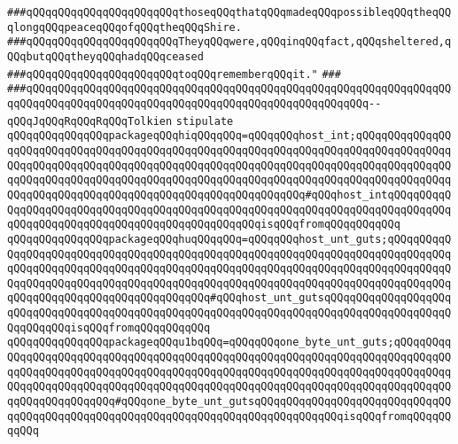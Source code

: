 \verb|###qQQqqQQqqQQqqQQqqQQqqQQqthoseqQQqthatqQQqmadeqQQqpossibleqQQqtheqQQqlongqQQqpeaceqQQqofqQQqtheqQQqShire.|\newline
\verb|###qQQqqQQqqQQqqQQqqQQqqQQqTheyqQQqwere,qQQqinqQQqfact,qQQqsheltered,qQQqbutqQQqtheyqQQqhadqQQqceased|\newline
\verb|###qQQqqQQqqQQqqQQqqQQqqQQqtoqQQqrememberqQQqit."|\newline
\verb|###|\newline
\verb|###qQQqqQQqqQQqqQQqqQQqqQQqqQQqqQQqqQQqqQQqqQQqqQQqqQQqqQQqqQQqqQQqqQQqqQQqqQQqqQQqqQQqqQQqqQQqqQQqqQQqqQQqqQQqqQQqqQQqqQQqqQQq--qQQqJqQQqRqQQqRqQQqTolkien|\newline
\newline
\newline
\verb|stipulate|\newline
\verb|qQQqqQQqqQQqqQQqpackageqQQqhiqQQqqQQq=qQQqqQQqhost_int;qQQqqQQqqQQqqQQqqQQqqQQqqQQqqQQqqQQqqQQqqQQqqQQqqQQqqQQqqQQqqQQqqQQqqQQqqQQqqQQqqQQqqQQqqQQqqQQqqQQqqQQqqQQqqQQqqQQqqQQqqQQqqQQqqQQqqQQqqQQqqQQqqQQqqQQqqQQqqQQqqQQqqQQqqQQqqQQqqQQqqQQqqQQqqQQqqQQqqQQqqQQqqQQqqQQqqQQqqQQqqQQqqQQqqQQqqQQqqQQqqQQqqQQqqQQqqQQqqQQqqQQqqQQqqQQq#qQQqhost_intqQQqqQQqqQQqqQQqqQQqqQQqqQQqqQQqqQQqqQQqqQQqqQQqqQQqqQQqqQQqqQQqqQQqqQQqqQQqqQQqqQQqqQQqqQQqqQQqqQQqqQQqqQQqqQQqqQQqqQQqisqQQqfromqQQqqQQqqQQq|\newline
\verb|qQQqqQQqqQQqqQQqpackageqQQqhuqQQqqQQq=qQQqqQQqhost_unt_guts;qQQqqQQqqQQqqQQqqQQqqQQqqQQqqQQqqQQqqQQqqQQqqQQqqQQqqQQqqQQqqQQqqQQqqQQqqQQqqQQqqQQqqQQqqQQqqQQqqQQqqQQqqQQqqQQqqQQqqQQqqQQqqQQqqQQqqQQqqQQqqQQqqQQqqQQqqQQqqQQqqQQqqQQqqQQqqQQqqQQqqQQqqQQqqQQqqQQqqQQqqQQqqQQqqQQqqQQqqQQqqQQqqQQqqQQqqQQqqQQqqQQqqQQqqQQq#qQQqhost_unt_gutsqQQqqQQqqQQqqQQqqQQqqQQqqQQqqQQqqQQqqQQqqQQqqQQqqQQqqQQqqQQqqQQqqQQqqQQqqQQqqQQqqQQqqQQqqQQqqQQqqQQqisqQQqfromqQQqqQQqqQQq|\newline
\verb|qQQqqQQqqQQqqQQqpackageqQQqu1bqQQq=qQQqqQQqone_byte_unt_guts;qQQqqQQqqQQqqQQqqQQqqQQqqQQqqQQqqQQqqQQqqQQqqQQqqQQqqQQqqQQqqQQqqQQqqQQqqQQqqQQqqQQqqQQqqQQqqQQqqQQqqQQqqQQqqQQqqQQqqQQqqQQqqQQqqQQqqQQqqQQqqQQqqQQqqQQqqQQqqQQqqQQqqQQqqQQqqQQqqQQqqQQqqQQqqQQqqQQqqQQqqQQqqQQqqQQqqQQqqQQqqQQqqQQqqQQqqQQq#qQQqone_byte_unt_gutsqQQqqQQqqQQqqQQqqQQqqQQqqQQqqQQqqQQqqQQqqQQqqQQqqQQqqQQqqQQqqQQqqQQqqQQqqQQqqQQqqQQqisqQQqfromqQQqqQQqqQQq|\newline

